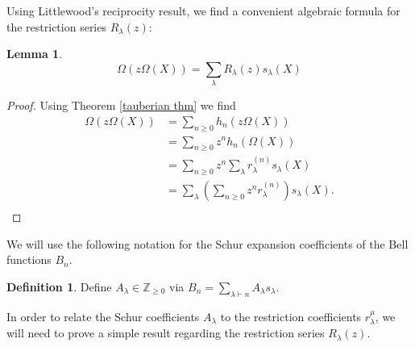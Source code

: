 \documentclass[12pt,reqno]{amsart}
\theoremstyle{definition}
\newtheorem{lem}[thm]{Lemma}
\newtheorem{defn}[thm]{Definition}
\begin{document}
Using Littlewood's reciprocity result, we find a convenient algebraic formula for the restriction series $R_{\lambda}(z):$

\begin{lem}\label{restriction lemma}
    $$\Omega\left(z \Omega(X) \right) = \sum_{\lambda} R_{\lambda}(z) s_{\lambda}(X)$$
\end{lem}
\begin{proof}
Using Theorem \ref{tauberian thm} we find
    \begin{align*}
        \Omega\left(z \Omega(X) \right) &= \sum_{n \geq 0} h_n(z\Omega(X)) \\
        &= \sum_{n \geq 0} z^{n} h_{n}(\Omega(X))\\ 
        &= \sum_{n \geq 0} z^{n} \sum_{\lambda} r_{\lambda}^{(n)} s_{\lambda}(X)\\
        &= \sum_{\lambda} \left( \sum_{n \geq 0} z^{n} r_{\lambda}^{(n)} \right) s_{\lambda}(X).\\
    \end{align*}

\end{proof}

We will use the following notation for the Schur expansion coefficients of the Bell functions $B_n.$

\begin{defn}
    Define $A_{\lambda} \in \mathbb{Z}_{\geq 0}$ via 
    $B_n = \sum_{\lambda \vdash n} A_{\lambda} s_{\lambda}.$
\end{defn}

In order to relate the Schur coefficients $A_{\lambda}$ to the restriction coefficients $r_{\lambda}^{\mu}$, we will need to prove a simple result regarding the restriction series $R_{\lambda}(z).$
\end{document}

